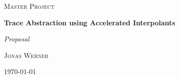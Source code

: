 \documentclass{article}
\begin{document}
	\newcommand{\HorizontalLine}{\rule{\linewidth}{0.3mm}}
	
		\begin{center}
		{\scshape\Large Master Project \par}
		\vspace{1.5cm}
		{\huge\bfseries Trace Abstraction using Accelerated Interpolants \par}
		{\Huge\itshape Proposal \par}
		\vspace{1cm}
		{\large \scshape Jonas Werner\par}
		\vspace{0.5cm}
		{\today \vspace{2cm}} 
		
		\end{center}
\end{document}
